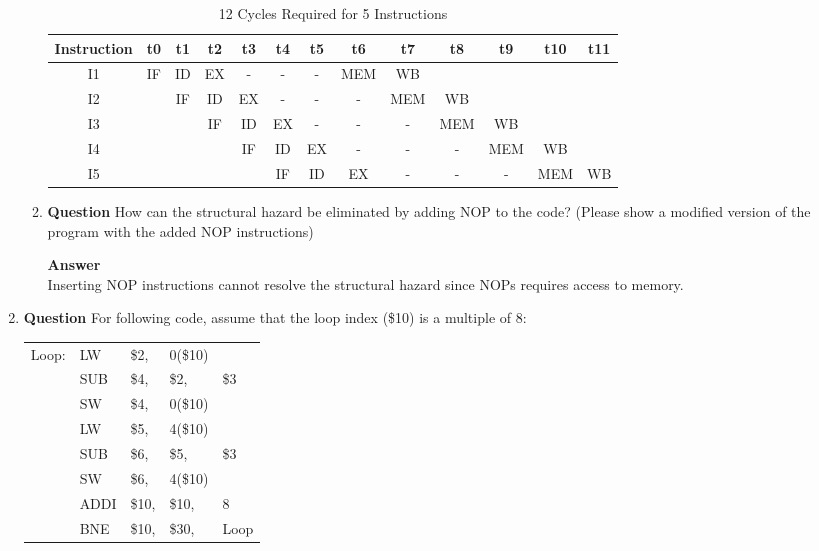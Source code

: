 \documentclass[paper=usletter, fontsize=12pt]{article}
\begin{document}
\begin{enumerate}
\begin{enumerate}
            \begin{table}[h]
                \caption{12 Cycles Required for 5 Instructions}
                \centering
                \begin{tabular*}{450pt}{@{\extracolsep{\fill}} c|cccccccccccc}

                \textbf{Instruction} & \textbf{t0} & \textbf{t1} & \textbf{t2} & \textbf{t3} & \textbf{t4} & \textbf{t5} & \textbf{t6} & \textbf{t7} & \textbf{t8} & \textbf{t9} & \textbf{t10} & \textbf{t11} \\
                \hline
                I1 & IF & ID & EX & - & - & - & MEM & WB & & & & \\
                I2 & & IF & ID & EX & - & - & - & MEM & WB & & & \\
                I3 & & & IF & ID & EX & - & - & - & MEM & WB & & \\
                I4 & & & & IF & ID & EX & - & - & - & MEM & WB & \\
                I5 & & & & & IF & ID & EX & - & - & - & MEM & WB \\
                \end{tabular*}
            \end{table}

            \item \textbf{Question}
            How can the structural hazard be eliminated by adding NOP to the code? (Please show a modified version of the program with the added NOP instructions)

            \textbf{Answer} \\
            Inserting NOP instructions cannot resolve the structural hazard since NOPs requires access to memory.

        \end{enumerate}

        \item \textbf{Question}
        For following code, assume that the loop index (\$10) is a multiple of 8:

        \begin{table}[h]
            \centering
            \begin{tabular*}{200pt}{@{\extracolsep{\fill}} lllll}
            Loop:   & LW & \$2, & 0(\$10) & \\
                    & SUB & \$4, & \$2, & \$3 \\
                    & SW & \$4, & 0(\$10) & \\
                    & LW & \$5, & 4(\$10) & \\
                    & SUB & \$6, & \$5, & \$3 \\
                    & SW & \$6, & 4(\$10) & \\
                    & ADDI & \$10, & \$10, & 8 \\
                    & BNE & \$10, & \$30, & Loop \\
            \end{tabular*}
        \end{table}
        \newpage


\end{enumerate}
\end{document}
